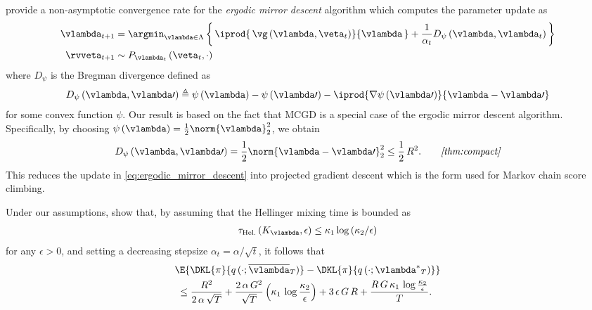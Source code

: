 \begin{proofEnd}
  \citet[Corollary 3.5]{duchi_ergodic_2012} provide a non-asymptotic convergence rate for the \textit{ergodic mirror descent} algorithm which computes the parameter update as
  \begin{align}
    \vlambda_{t+1} &= \argmin_{\vlambda \in \Lambda} \left\{\,
    \iprod{\,\vg\left(\vlambda, \veta_t\right)}{\vlambda\,} 
    +
    \frac{1}{\alpha_t} D_{\psi}\left(\vlambda, \vlambda_{t}\right)
    \,\right\}\label{eq:ergodic_mirror_descent}
    \\
    \rvveta_{t+1} &\sim P_{\vlambda_{t}}\left(\veta_t, \cdot\right)
    \nonumber
  \end{align}
  where \(D_{\psi}\) is the Bregman divergence defined as
  \begin{align*}
    D_{\psi}\left(\vlambda, \vlambda\prime\right)
    \triangleq
    \psi\left(\vlambda\right)
    - \psi\left(\vlambda\prime\right)
    - \iprod{ \nabla \psi\left(\vlambda\prime\right)}{\vlambda - \vlambda\prime}
  \end{align*}
  for some convex function \(\psi\).
  Our result is based on the fact that MCGD is a special case of the ergodic mirror descent algorithm.
  Specifically, by choosing \(\psi\left(\vlambda\right) = \frac{1}{2} \norm{\vlambda}^2_2 \), we obtain
  \begin{alignat}{2}
    D_{\psi}\left(\vlambda, \vlambda\prime\right) = \frac{1}{2} \norm{\vlambda - \vlambda\prime}_2^2 \leq \frac{1}{2} \, R^2.\label{eq:bregman}
    &&\quad\text{\textit{\cref{thm:compact}}}
  \end{alignat}
  This reduces the update in \cref{eq:ergodic_mirror_descent} into projected gradient descent which is the form used for Markov chain score climbing.

  Under our assumptions, \citet[Corollary 3.5]{duchi_ergodic_2012} show that, by assuming that the Hellinger mixing time is bounded as
  \begin{align}
    \tau_{\text{Hel.}}\left(K_{\vlambda}, \epsilon\right) \leq \kappa_1 \log\left( \kappa_2 /\epsilon \right) \label{eq:hellinger_mixing}
  \end{align}
  for any \(\epsilon > 0\), and setting a decreasing stepsize \(\alpha_t = \alpha / \sqrt{t}\),
  it follows that
  \begin{align}
    &\E{ \DKL{\pi}{q\,(\cdot; {\overline{\vlambda}_{T}})} - \DKL{\pi}{q\left(\cdot; {\vlambda^*}_{T}\right)}}
    \nonumber
    \\
    &\;\leq
    \frac{R^2}{2 \, \alpha \, \sqrt{T}}
    +
    \frac{2 \, \alpha \, G^2}{\sqrt{T}}\left( \kappa_1 \, \log \frac{\kappa_2}{\epsilon} \right)
    +
    3 \, \epsilon \, G \, R
    +
    \frac{R \, G \, \kappa_1 \, \log \frac{\kappa_2}{\epsilon}}{T}.
    \label{eq:duchi_base}
  \end{align}


\end{proofEnd}
